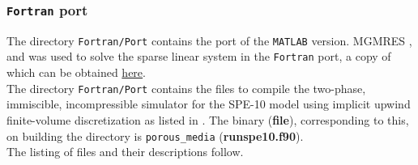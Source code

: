 \subsubsection{\texttt{Fortran} port}\label{sec_fortran_port_porous}
The directory \texttt{Fortran/Port} contains the port of the \texttt{MATLAB} version. MGMRES \cite{Barrett_1994},\cite{Kelley_1995} and \cite{Saad_2003} was used to solve the sparse linear system in the \texttt{Fortran} port, a copy of which can be obtained \href{http://people.sc.fsu.edu/~jburkardt/m_src/mgmres/mgmres.html}{here}.\\

\noindent The directory \texttt{Fortran/Port} contains the files to compile the two-phase, immiscible, incompressible simulator for the SPE-10 model using implicit upwind finite-volume discretization as listed in \cite{Aarnes_2007}. The binary (\textbf{file}), corresponding to this, on building the directory is \texttt{porous\_media} (\textbf{{runspe10.f90}}).\\

\noindent The listing of files and their descriptions follow.\\

